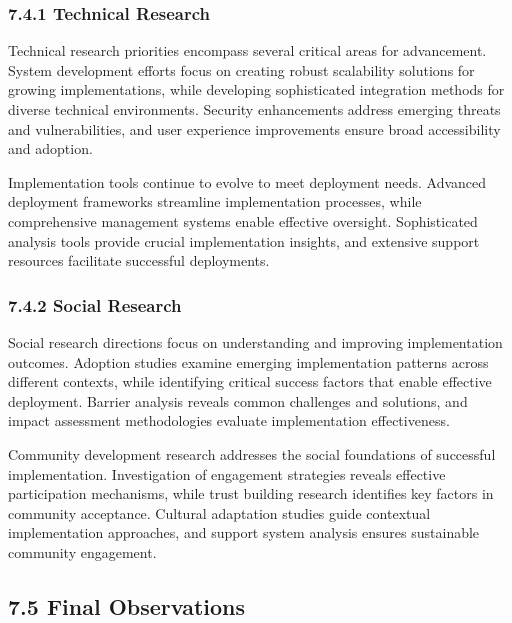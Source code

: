 \hypertarget{technical-research-1}{%
\subsubsection{7.4.1 Technical Research}\label{technical-research-1}}

Technical research priorities encompass several critical areas for advancement. System development efforts focus on creating robust scalability solutions for growing implementations, while developing sophisticated integration methods for diverse technical environments. Security enhancements address emerging threats and vulnerabilities, and user experience improvements ensure broad accessibility and adoption.

Implementation tools continue to evolve to meet deployment needs. Advanced deployment frameworks streamline implementation processes, while comprehensive management systems enable effective oversight. Sophisticated analysis tools provide crucial implementation insights, and extensive support resources facilitate successful deployments.

\hypertarget{social-research-1}{%
\subsubsection{7.4.2 Social Research}\label{social-research-1}}

Social research directions focus on understanding and improving implementation outcomes. Adoption studies examine emerging implementation patterns across different contexts, while identifying critical success factors that enable effective deployment. Barrier analysis reveals common challenges and solutions, and impact assessment methodologies evaluate implementation effectiveness.

Community development research addresses the social foundations of successful implementation. Investigation of engagement strategies reveals effective participation mechanisms, while trust building research identifies key factors in community acceptance. Cultural adaptation studies guide contextual implementation approaches, and support system analysis ensures sustainable community engagement.

\hypertarget{final-observations}{%
\subsection{7.5 Final Observations}\label{final-observations}}


